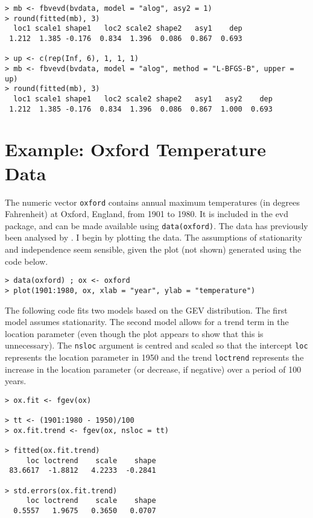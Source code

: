 \documentclass[11pt,a4paper]{article}
\begin{document}
\begin{verbatim}
> mb <- fbvevd(bvdata, model = "alog", asy2 = 1)
> round(fitted(mb), 3)
  loc1 scale1 shape1   loc2 scale2 shape2   asy1    dep 
 1.212  1.385 -0.176  0.834  1.396  0.086  0.867  0.693

> up <- c(rep(Inf, 6), 1, 1, 1)
> mb <- fbvevd(bvdata, model = "alog", method = "L-BFGS-B", upper = up)
> round(fitted(mb), 3)
  loc1 scale1 shape1   loc2 scale2 shape2   asy1   asy2    dep 
 1.212  1.385 -0.176  0.834  1.396  0.086  0.867  1.000  0.693
\end{verbatim}


\section{Example: Oxford Temperature Data}
\setcounter{footnote}{0}
\label{egoxford}

The numeric vector \verb+oxford+ contains annual maximum temperatures (in degrees Fahrenheit) at Oxford, England, from 1901 to 1980.
It is included in the evd package, and can be made available using \verb+data(oxford)+. 
The data has previously been analysed by \citet{tabo83}.
I begin by plotting the data.
The assumptions of stationarity and independence seem sensible, given the plot (not shown) generated using the code below.

\begin{verbatim}
> data(oxford) ; ox <- oxford
> plot(1901:1980, ox, xlab = "year", ylab = "temperature")
\end{verbatim}

The following code fits two models based on the GEV distribution.
The first model assumes stationarity. 
The second model allows for a trend term in the location parameter (even though the plot appears to show that this is unnecessary).
The \verb+nsloc+ argument is centred and scaled so that the intercept \verb+loc+ represents the location parameter in 1950 and the trend \verb+loctrend+ represents the increase in the location parameter (or decrease, if negative) over a period of 100 years.

\begin{verbatim}
> ox.fit <- fgev(ox)

> tt <- (1901:1980 - 1950)/100
> ox.fit.trend <- fgev(ox, nsloc = tt)

> fitted(ox.fit.trend)
     loc loctrend    scale    shape
 83.6617  -1.8812   4.2233  -0.2841

> std.errors(ox.fit.trend)
     loc loctrend    scale    shape
  0.5557   1.9675   0.3650   0.0707
\end{verbatim}
\end{document}

